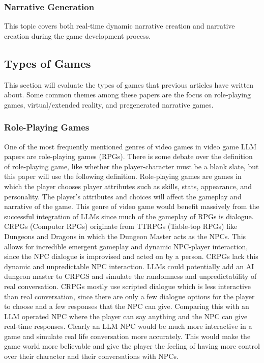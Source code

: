 \documentclass[10pt,twocolumn]{article}
\begin{document}
\subsubsection{Narrative Generation}
This topic covers both real-time dynamic narrative creation and narrative creation during the game development process.


\subsection{Types of Games}
This section will evaluate the types of games that previous articles have written about. Some common themes among these papers are the focus on role-playing games, virtual/extended reality, and pregenerated narrative games.

\subsubsection{Role-Playing Games}
One of the most frequently mentioned genres of video games in video game LLM papers are role-playing games (RPGs). There is some debate over the definition of role-playing game, like whether the player-character must be a blank slate, but this paper will use the following definition. Role-playing games are games in which the player chooses player attributes such as skills, stats, appearance, and personality. The player's attributes and choices will affect the gameplay and narrative of the game. This genre of video game would benefit massively from the successful integration of LLMs since much of the gameplay of RPGs is dialogue. CRPGs (Computer RPGs) originate from TTRPGs (Table-top RPGs) like Dungeons and Dragons in which the Dungeon Master acts as the NPCs. This allows for incredible emergent gameplay and dynamic NPC-player interaction, since the NPC dialogue is improvised and acted on by a person. CRPGs lack this dynamic and unpredictable NPC interaction. LLMs could potentially add an AI dungeon master to CRPGS and simulate the randomness and unpredictability of real conversation. CRPGs mostly use scripted dialogue which is less interactive than real conversation, since there are only a few dialogue options for the player to choose and a few responses that the NPC can give. Comparing this with an LLM operated NPC where the player can say anything and the NPC can give real-time responses. Clearly an LLM NPC would be much more interactive in a game and simulate real life conversation more accurately. This would make the game world more believable and give the player the feeling of having more control over their character and their conversations with NPCs.
\end{document}

